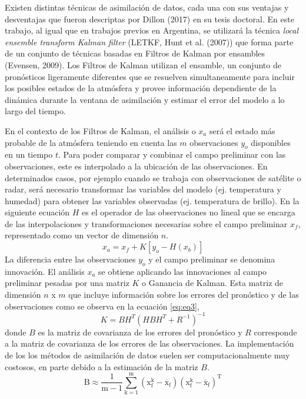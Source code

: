 \documentclass[12pt,oneside]{reedthesis}
\begin{document}
Existen distintas técnicas de asimilación de datos, cada una con sus ventajas y desventajas que fueron descriptas por Dillon (2017) en su tesis doctoral. En este trabajo, al igual que en trabajos previos en Argentina, se utilizará la técnica \emph{local ensemble transform Kalman filter} (LETKF, Hunt et al. (2007)) que forma parte de un conjunto de técnicas basadas en Filtros de Kalman por ensambles (Evensen, 2009). Los Filtros de Kalman utilizan el ensamble, un conjunto de pronósticos ligeramente diferentes que se resuelven simultaneamente para incluir los posibles estados de la atmósfera y provee información dependiente de la dinámica durante la ventana de asimilación y estimar el error del modelo a lo largo del tiempo.

En el contexto de los Filtros de Kalman, el análisis o \(x_a\) será el estado más probable de la atmósfera teniendo en cuenta las \(m\) observaciones \(y_o\) disponibles en un tiempo \(t\). Para poder comparar y combinar el campo preliminar con las observaciones, este es interpolado a la ubicación de las observaciones. En determinados casos, por ejemplo cuando se trabaja con observaciones de satélite o radar, será necesario transformar las variables del modelo (ej. temperatura y humedad) para obtener las variables observadas (ej. temperatura de brillo). En la siguiente ecuación \(H\) es el operador de las observaciones no lineal que se encarga de las interpolaciones y transformaciones necesarias sobre el campo preliminar \(x_f\), representado como un vector de dimensión \(n\).
\begin{equation}
x_a = x_f + K[y_o - H(x_b )]
\label{eq:eq1}
\end{equation}
La diferencia entre las observaciones \(y_o\) y el campo preliminar se denomina innovación. El análisis \(x_a\) se obtiene aplicando las innovaciones al campo preliminar pesadas por una matriz \(K\) o Ganancia de Kalman. Esta matriz de dimensión \(n\) x \(m\) que incluye información sobre los errores del pronóstico y de las observaciones como se observa en la ecuación \eqref{eq:eq3},
\begin{equation}
K = BH^T (HBH^T + R^{-1})^{-1}
\label{eq:eq3}
\end{equation}
donde \(B\) es la matriz de covarianza de los errores del pronóstico y \(R\) corresponde a la matriz de covarianza de los errores de las observaciones. La implementación de los los métodos de asimilación de datos suelen ser computacionalmente muy costosos, en parte debido a la estimación de la matriz \(B\).
\begin{equation}
\mathrm{ B \approx \frac{1}{m-1} \sum_{k=1}^{m}(x_{f}^{k}-\overline{x}_f)(x_{f}^{k}-\overline{x}_f)^T}
\label{eq:eq5}
\end{equation}
\end{document}
